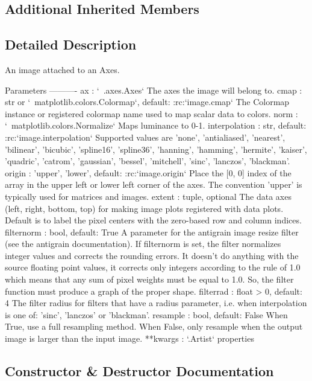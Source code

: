 \subsection*{Additional Inherited Members}


\subsection{Detailed Description}
\begin{DoxyVerb}An image attached to an Axes.

Parameters
----------
ax : `~.axes.Axes`
    The axes the image will belong to.
cmap : str or `~matplotlib.colors.Colormap`, default: :rc:`image.cmap`
    The Colormap instance or registered colormap name used to map scalar
    data to colors.
norm : `~matplotlib.colors.Normalize`
    Maps luminance to 0-1.
interpolation : str, default: :rc:`image.interpolation`
    Supported values are 'none', 'antialiased', 'nearest', 'bilinear',
    'bicubic', 'spline16', 'spline36', 'hanning', 'hamming', 'hermite',
    'kaiser', 'quadric', 'catrom', 'gaussian', 'bessel', 'mitchell',
    'sinc', 'lanczos', 'blackman'.
origin : {'upper', 'lower'}, default: :rc:`image.origin`
    Place the [0, 0] index of the array in the upper left or lower left
    corner of the axes. The convention 'upper' is typically used for
    matrices and images.
extent : tuple, optional
    The data axes (left, right, bottom, top) for making image plots
    registered with data plots.  Default is to label the pixel
    centers with the zero-based row and column indices.
filternorm : bool, default: True
    A parameter for the antigrain image resize filter
    (see the antigrain documentation).
    If filternorm is set, the filter normalizes integer values and corrects
    the rounding errors. It doesn't do anything with the source floating
    point values, it corrects only integers according to the rule of 1.0
    which means that any sum of pixel weights must be equal to 1.0. So,
    the filter function must produce a graph of the proper shape.
filterrad : float > 0, default: 4
    The filter radius for filters that have a radius parameter, i.e. when
    interpolation is one of: 'sinc', 'lanczos' or 'blackman'.
resample : bool, default: False
    When True, use a full resampling method. When False, only resample when
    the output image is larger than the input image.
**kwargs : `.Artist` properties
\end{DoxyVerb}
 

\subsection{Constructor \& Destructor Documentation}
\mbox{\label{classmatplotlib_1_1image_1_1AxesImage_ac756938f67fd63492f2260aa808ea62f}} 
